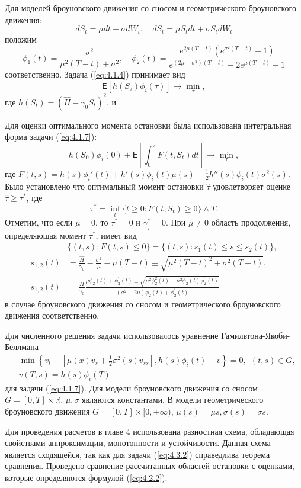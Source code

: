 Для моделей броуновского движения со сносом и геометрического броуновского движения: $$dS_t=\mu dt+\sigma dW_t, \quad dS_t=\mu S_t dt+\sigma S_t dW_t$$
положим
$$
\phi_1(t)=\frac{\sigma^2}{\mu^2(T-t)+\sigma^2}, \quad \phi_2(t)=\frac{e^{2\mu(T-t)}(e^{\sigma^2(T-t)}-1)}{e^{(2\mu+\sigma^2)(T-t)}-2e^{\mu(T-t)}+1}
$$ 
соответственно. Задача (\ref{eq:4.1.4}) принимает вид
\begin{equation}
\label{eq:4.1.7}
\mathsf E[h(S_\tau)\phi_i(\tau)] \to \min_{\tau},
\end{equation} 
где $h(S_t)=(\widehat H - \gamma_0 S_t)^2$, и

Для оценки оптимального момента остановки была использована интегральная форма задачи (\ref{eq:4.1.7}):
\begin{equation}
\label{eq:4.2.1}
h(S_0)\phi_i(0)+\mathsf E\left [\int_0^\tau F(t,S_t)dt \right ] \to \min_{\tau},
\end{equation}
где $F(t,s)=h(s)\phi_i'(t)+ h'(s)\phi_i(t)\mu(s)+\frac{1}{2}h''(s)\phi_i(t)\sigma^2(s).$ Было установлено что оптимальный момент остановки $\hat \tau$ удовлетворяет оценке $\hat \tau \ge \tau^*$, где 
\begin{equation} \label{eq:4.2.2}
\tau^*=\inf_t\{t\ge 0: F(t,S_t) \ge 0\} \wedge T.
\end{equation}
Отметим, что если $\mu=0$, то $\tau^*=0$ и $\gamma^*_\tau=0$. При $\mu \neq 0$ область продолжения, определяющая момент $\tau^*$, имеет вид
\begin{align*}
&\{(t,s): F(t,s) \le 0\}=\{(t,s): s_1(t) \le s \le s_2(t)\},\\
s_{1,2}(t)&=\frac{\widehat H}{\gamma_0}-\frac{\sigma^2}{\mu}-\mu(T-t) \pm \sqrt{\mu^2(T-t)^2+\sigma^2(T-t)},\\
s_{1,2}(t)&=\frac{H}{\gamma_0}\frac{\mu\phi_2(t)+\phi_2^\prime(t)\pm \sqrt{\mu^2\phi_2^2(t)-\sigma^2\phi_2(t)\phi_2^\prime(t)}}{(\sigma^2+2\mu)\phi_2(t)+\phi_2^\prime(t)}
\end{align*}
в случае броуновского движения со сносом и геометрического броуновского движения соответственно. 

Для численного решения задачи использовалось уравнение Гамильтона-Якоби-Беллмана
\begin{align}
\label{eq:4.3.2}
&\min{\left\{v_t - [\mu(x)v_{s}+\frac{1}{2}\sigma^2(s) v_{ss}],h(s)\phi_i(t)-v\right\}}=0,\ \ (t,s)\in G,\\
&v(T,s)=h(s)\phi_i(T)
\end{align}
для задачи (\ref {eq:4.1.7}).
Для модели броуновского движения со сносом $G=[0,T] \times\mathbb R$, $\mu, \sigma$ являются константами.
В модели геометрического броуновского движения $G=[0,T] \times [0,+\infty)$, $\mu(s)=\mu s, \sigma(s)=\sigma s$.

Для проведения расчетов в главе 4 использована разностная схема, обладающая свойствами аппроксимации, монотонности и устойчивости. Данная схема является сходящейся, так как для задачи (\ref{eq:4.3.2}) справедлива теорема сравнения. Проведено сравнение рассчитанных областей остановки с оценками, которые определяются формулой (\ref{eq:4.2.2}).


